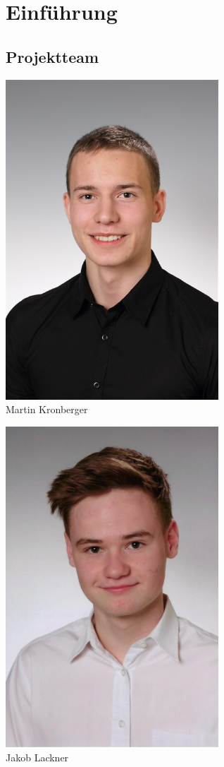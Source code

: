 \chapter{Einführung}
\section{Projektteam}

\centering
\medskip
\begin{minipage}{0.45\textwidth}
	\centering
	\includegraphics[width=0.6\textwidth]{figures/allgemein/portrait_Kronberger.jpg} 
	\medskip	
	\\Martin Kronberger
\end{minipage}\hfill
\begin{minipage}{0.45\textwidth}
	\centering
	\includegraphics[width=0.6\textwidth]{figures/allgemein/portrait_Lackner.jpg} 
	\medskip
	\\Jakob Lackner
\end{minipage}
\vspace{1cm}

